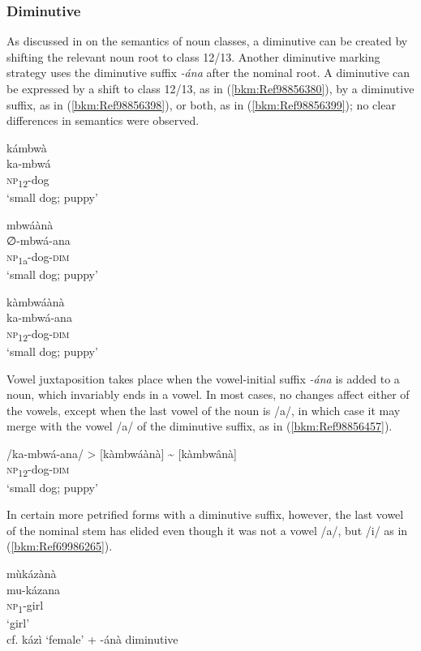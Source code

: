 \subsubsection{Diminutive}

As discussed in  on the semantics of noun classes, a diminutive can be created by shifting the relevant noun root to class 12/13. Another diminutive marking strategy uses the diminutive suffix \textit{-ána} after the nominal root. A diminutive can be expressed by a shift to class 12/13, as in (\ref{bkm:Ref98856380}), by a diminutive suffix, as in (\ref{bkm:Ref98856398}), or both, as in (\ref{bkm:Ref98856399}); no clear differences in semantics were observed.

\ea
\label{bkm:Ref98856380}
\glll kámbwà\\
ka-mbwá\\
\textsc{np}\textsubscript{12}-dog\\
\glt ‘small dog; puppy’
\z

\ea
\label{bkm:Ref98856398}
\glll mbwáànà\\
∅-mbwá-ana\\
\textsc{np}\textsubscript{1a}-dog-\textsc{dim}\\
\glt ‘small dog; puppy’
\z

\ea
\label{bkm:Ref98856399}
\glll kàmbwáànà\\
ka-mbwá-ana\\
\textsc{np}\textsubscript{12}-dog-\textsc{dim}\\
\glt ‘small dog; puppy’
\z

Vowel juxtaposition takes place when the vowel-initial suffix \textit{-ána} is added to a noun, which invariably ends in a vowel. In most cases, no changes affect either of the vowels, except when the last vowel of the noun is /a/, in which case it may merge with the vowel /a/ of the diminutive suffix, as in (\ref{bkm:Ref98856457}).

\ea
\label{bkm:Ref98856457}
\gll /ka-mbwá-ana/ > [kàmbwáànà] {\textasciitilde} [kàmbwânà]\\
\textsc{np}\textsubscript{12}-dog-\textsc{dim}\\
\glt ‘small dog; puppy’
\z

In certain more petrified forms with a diminutive suffix, however, the last vowel of the nominal stem has elided even though it was not a vowel /a/, but /i/ as in (\ref{bkm:Ref69986265}).

\ea
\label{bkm:Ref69986265}
\glll mùkázànà\\
mu-kázana\\
\textsc{np}\textsubscript{1}-girl\\
\glt ‘girl’\\
 cf. kázì ‘female’ + -ánà diminutive
\z

